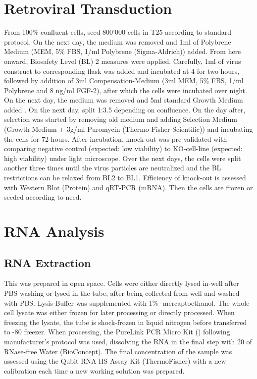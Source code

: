 \section{Retroviral Transduction}
From 100\% confluent cells, seed 800'000 cells in T25 according to standard protocol. On the next day, the medium was removed and 1ml of Polybrene Medium (MEM\textalpha{}, 5\% FBS, 1\mul{}/ml Polybrene (Sigma-Aldrich)) added. From here onward, Biosafety Level (BL) 2 measures were applied. Carefully, 1ml of virus construct to corresponding flask was added and incubated at 4 \degC for two hours, followed by addition of 3ml Compensation-Medium (3ml MEM\textalpha{}, 5\% FBS, 1\mul{}/ml Polybrene and 8 ng/ml FGF-2), after which the cells were incubated over night. On the next day, the medium was removed and 5ml standard Growth Medium added . On the next day, split 1:3.5 depending on confluence. On the day after, selection was started by removing old medium and adding Selection Medium (Growth Medium + 3\textmu{}g/ml Puromycin (Thermo Fisher Scientific)) and incubating the cells for 72 hours. After incubation, knock-out was pre-validated with comparing negative control (expected: low viability) to KO-cell-line (expected: high viability) under light microscope. Over the next days, the cells were split another three times until the virus particles are neutralized and the BL restrictions can be relaxed from BL2 to BL1. Efficiency of knock-out is  assessed with Western Blot (Protein) and qRT-PCR (mRNA). Then the cells are frozen or seeded according to need. 

\section{RNA Analysis}
\subsection{RNA Extraction}
This was prepared in open space. Cells were either directly lysed in-well after PBS washing or lysed in the tube, after being collected from well and washed with PBS. Lysis-Buffer was supplemented with 1\% \textbeta-mercaptoethanol. The whole cell lysate was either frozen for later processing or directly processed. When freezing the lysate, the tube is shock-frozen in liquid nitrogen before transferred to -80 \degC freezer. When processing, the PureLink PCR Micro Kit () following manufacturer's protocol was used, dissolving the RNA in the final step with 20\mul{} of RNase-free Water (BioConcept). The final concentration of the sample was assessed using the Qubit RNA HS Assay Kit (ThermoFisher) with a new calibration each time a new working solution was prepared.

